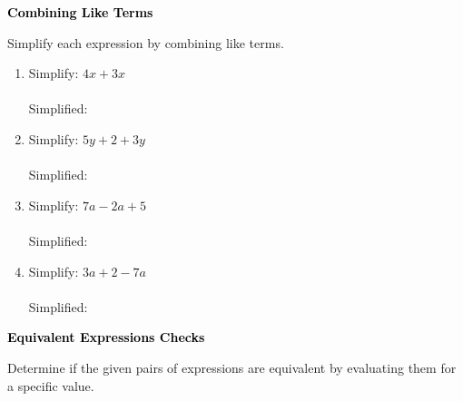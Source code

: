 \documentclass[12pt, letterpaper, fleqn]{article}
\newcommand{\blanklong}{\underline{\hspace{6.5cm}}}
\begin{document}
\newpage

\begin{tcolorbox}[colback=black!10]
\large\textcolor{black}{\textbf{Combining Like Terms}}
\end{tcolorbox}

\noindent
Simplify each expression by combining like terms.

\vspace{3mm}

\begin{enumerate}[itemsep=1.5cm, leftmargin=0.6cm]

\item Simplify: $4x + 3x$ \\ \\
Simplified: \blanklong

\vspace{1.5cm}

\item Simplify: $5y + 2 + 3y$ \\ \\
Simplified: \blanklong

\vspace{1.5cm}

\item Simplify: $7a - 2a + 5$ \\ \\
Simplified: \blanklong

\vspace{1.5cm}

\item Simplify: $3a + 2 -7a$ \\ \\
Simplified: \blanklong

\vspace{1.5cm}

\end{enumerate}

\newpage

\begin{tcolorbox}[colback=black!10]
\large\textcolor{black}{\textbf{Equivalent Expressions Checks}}
\end{tcolorbox}

\noindent
Determine if the given pairs of expressions are equivalent by evaluating them for a specific value.
\end{document}
